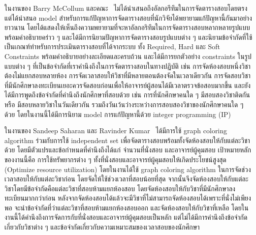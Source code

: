 ในงานของ Barry McCollum และคณะ~\cite{auto-timetable} 
ไม่ได้นำเสนอถึงอัลกอรึทึมในการจัดตารางสอบโดยตรง แต่ได้นำสนอ model สำหรับการแก้ปัญหาการจัดตารางสอบที่นักวิจัยได้พยายามแก้ปัญหานี้กันมาอย่างยาวนาน
โดยได้แสดงให้เห็นถึงความพยายามที่จะหาอัลกอริทึมในการจัดตารางสอบหลากหลายรูปแบบพร้อมคำอธิบายคร่าว ๆ และได้มีการนิยามปัญหาการจัดตารางสอบรูปแบบต่าง ๆ
และนิยามข้อจำกัดที่ใช้เป็นเกณฑ์ทำหรับการประเมินตารางสอบที่ได้จากระบบ ทั้ง Required, Hard และ Soft Constraints พร้อมคำอธิบายอย่างละเอียดและครบถ้วน 
และได้มีการยกตัวอย่าง constraints ในรูปแบบต่าง ๆ ที่เป็นข้อจำกัดที่เราคำนึงถึงในการจัดตารางสอบในทางปฏิบัติ เช่น การจัดห้องสอบหนึ่งวิชาต้องไม่แยกสอบหลายห้อง 
การจัดเวลาสอบให้วิชาที่มีหลายตอนต้องจัดในเวลาเดียวกัน การจัดสอบวิชาที่มีนักศึกษาลงทะเบียนเยอะควรจัดสอบก่อนเพื่อให้อาจารย์ผู้สอนได้มีเวลาตรวจข้อสอบมากขึ้น และยังได้มีการพูดถึงข้อจำกัดที่คำนึงถึงนักศึกษาที่สอบด้วย เช่น การที่นักศึกษาคนใด ๆ มีสอบสองวิชาติดกัน หรือ มีสอบหลายวิชาในวันเดียวกัน 
รวมถึงวันเว้นว่างระหว่างการสอบสองวิชาของนักศึกษาคนใด ๆ ด้วย โดยในงานนี้ได้มีการนิยาม model การแก้ปัญหานี้ด้วย integer programming (IP)

ในงานของ Sandeep Saharan และ Ravinder Kumar~\cite{graphcl-idepset}
ได้มีการใช้ graph coloring algorithm ร่วมกับการใช้ independent set
เพื่อจัดตารางสอบพร้อมทั้งจัดห้องสอบให้กับแต่ละวิชาด้วย โดยมีตัวแปรและข้อกำหนดที่คำนึงถึงได้แก่ จำนวนที่นั่งสอบ และอาจารย์ผู้คุมสอบ
เป้าหมายหลักของงานนี้คือ การใช้ทรัพยากรต่าง ๆ ทั้งที่นั่งสอบและอาจารย์ผู้คุมสอบให้เกิดประโยชน์สูงสุด (Optimize resource utilization)
โดยในงานได้ใช้ graph coloring algorithm ในการจัดช่วงเวลาสอบให้กับแต่ละวิชาก่อน โดยจัดให้ใช้ช่วงเวลาที่สอบน้อยที่สุด
จากนั้นจึงจัดห้องสอบให้กับแต่ละวิชาโดยมีข้อจำกัดคือแต่ละวิชาที่สอบห้ามแยกห้องสอบ โดยจัดห้องสอบให้กับวิชาที่มีนักศึกษาลงทะเบียนมากกว่าก่อน
หลังจากจัดห้องสอบได้แล้วจะมีวิชาที่ไม่สามารถจัดห้องสอบได้เพราะที่นั่งไม่เพียงพอ 
จะนำข้อจำกัดที่ว่าแต่ละวิชาที่สอบห้ามแยกห้องสอบออก และจัดห้องสอบให้กับวิชาที่เหลือ
โดยในงานนี้ได้คำนึงถึงการจัดการกับที่นั่งสอบและอาจารย์ผู้คุมสอบเป็นหลัก แต่ไม่ได้มีการคำนึงถึงข้อจำกัดเกี่ยวกับวิชาต่าง ๆ และข้อจำกัดเกี่ยวกับความเหมาะสมของเวลาสอบของนักศึกษา

